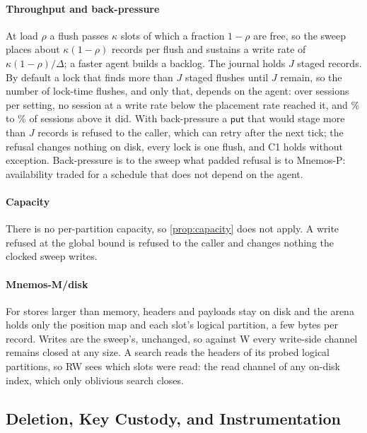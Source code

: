 \paragraph{Throughput and back-pressure} At load $\rho$ a flush passes $\kappa$ slots of which a
fraction $1-\rho$ are free, so the sweep places about $\kappa(1-\rho)$ records per flush and sustains
a write rate of $\kappa(1-\rho)/\Delta$; a faster agent builds a backlog. The journal holds $J$ staged
records. By default a lock that finds more than $J$ staged flushes until $J$ remain, so the number of
lock-time flushes, and only that, depends on the agent: over \REtwentyoneSessions{} sessions per
setting, no session at a write rate below the placement rate reached it, and
\REtwentyoneResidualLo\% to \REtwentyoneResidualHi\% of sessions above it did. With back-pressure a
$\mathsf{put}$ that would stage more than $J$ records is refused to the caller, which can retry
after the next tick; the refusal changes nothing on disk, every lock is one flush, and C1 holds
without exception. Back-pressure is to the sweep what padded refusal is to Mnemos-P: availability
traded for a schedule that does not depend on the agent.

\paragraph{Capacity} There is no per-partition capacity, so \cref{prop:capacity} does not apply. A
write refused at the global bound is refused to the caller and changes nothing the clocked sweep
writes.

\paragraph{Mnemos-M/disk} For stores larger than memory, headers and payloads stay on disk and the
arena holds only the position map and each slot's logical partition, a few bytes per record. Writes are the sweep's, unchanged, so against W every write-side channel
remains closed at any size. A search reads the headers of its probed logical partitions, so RW sees
which slots were read: the read channel of any on-disk index, which only oblivious search closes.

\subsection{Deletion, Key Custody, and Instrumentation}
\label{sec:mnemos-delete}
\label{sec:mnemos-keys}
\label{sec:mnemos-events}


